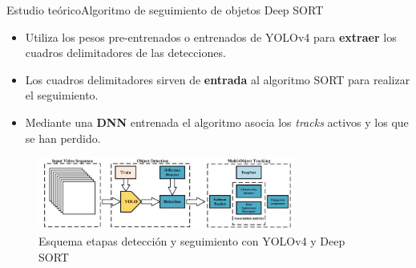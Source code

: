
\begin{frame}{Estudio teórico}{Algoritmo de seguimiento de objetos Deep SORT}

\begin{itemize}
    \justifying
    \item Utiliza los pesos pre-entrenados o entrenados de YOLOv4 para \textbf{extraer} los cuadros delimitadores de las detecciones.
    \item Los cuadros delimitadores sirven de \textbf{entrada} al algoritmo SORT para realizar el seguimiento.
    \item Mediante una \textbf{DNN} entrenada el algoritmo asocia los \textit{tracks} activos y los que se han perdido.
\end{itemize}

\begin{figure}[ht]
\centering
\includegraphics[width=0.75\textwidth]{Images/estudio-teorico/yolo-deepsort-scheme.jpg}
\caption{\label{fig:yolo-deepsort-scheme}Esquema etapas detección y seguimiento con YOLOv4 y Deep SORT}
\end{figure}

\end{frame}
